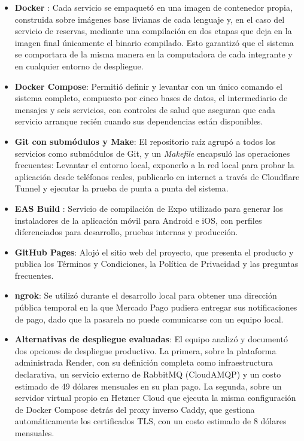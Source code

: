 \begin{itemize}
    \item \textbf{Docker} \autocite{docker}: Cada servicio se empaquetó en una imagen de contenedor propia, construida sobre imágenes base livianas de cada lenguaje y, en el caso del servicio de reservas, mediante una compilación en dos etapas que deja en la imagen final únicamente el binario compilado. Esto garantizó que el sistema se comportara de la misma manera en la computadora de cada integrante y en cualquier entorno de despliegue.
    \item \textbf{Docker Compose}: Permitió definir y levantar con un único comando el sistema completo, compuesto por cinco bases de datos, el intermediario de mensajes y seis servicios, con controles de salud que aseguran que cada servicio arranque recién cuando sus dependencias están disponibles.
    \item \textbf{Git con submódulos y Make}: El repositorio raíz agrupó a todos los servicios como submódulos de Git, y un \textit{Makefile} encapsuló las operaciones frecuentes: Levantar el entorno local, exponerlo a la red local para probar la aplicación desde teléfonos reales, publicarlo en internet a través de Cloudflare Tunnel y ejecutar la prueba de punta a punta del sistema.
    \item \textbf{EAS Build} \autocite{eas}: Servicio de compilación de Expo utilizado para generar los instaladores de la aplicación móvil para Android e iOS, con perfiles diferenciados para desarrollo, pruebas internas y producción.
    \item \textbf{GitHub Pages}: Alojó el sitio web del proyecto, que presenta el producto y publica los Términos y Condiciones, la Política de Privacidad y las preguntas frecuentes.
    \item \textbf{ngrok}: Se utilizó durante el desarrollo local para obtener una dirección pública temporal en la que Mercado Pago pudiera entregar sus notificaciones de pago, dado que la pasarela no puede comunicarse con un equipo local.
    \item \textbf{Alternativas de despliegue evaluadas}: El equipo analizó y documentó dos opciones de despliegue productivo. La primera, sobre la plataforma administrada Render, con su definición completa como infraestructura declarativa, un servicio externo de RabbitMQ (CloudAMQP) y un costo estimado de 49 dólares mensuales en su plan pago. La segunda, sobre un servidor virtual propio en Hetzner Cloud que ejecuta la misma configuración de Docker Compose detrás del proxy inverso Caddy, que gestiona automáticamente los certificados TLS, con un costo estimado de 8 dólares mensuales.
\end{itemize}

